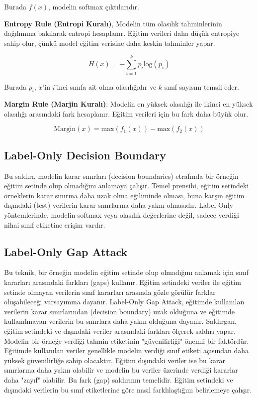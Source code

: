 Burada $f(x)$, modelin softmax çıktılarıdır.

\textbf{Entropy Rule (Entropi Kuralı)}, Modelin tüm olasılık tahminlerinin dağılımına bakılarak entropi hesaplanır. Eğitim verileri daha düşük entropiye sahip olur, çünkü model eğitim verisine daha keskin tahminler yapar.

\[ H(x) = - \sum_{i=1}^{k} p_i \text{log}(p_i) \]

Burada $p_i$, $x$'in $i$'inci sınıfa ait olma olasılığıdır ve $k$ sınıf sayısını temsil eder.

\textbf{Margin Rule (Marjin Kuralı)}: Modelin en yüksek olasılığı ile ikinci en yüksek olasılığı arasındaki fark hesaplanır. Eğitim verileri için bu fark daha büyük olur.

\[ \text{Margin}(x) = \text{max}(f_{1}(x)) - \text{max}(f_{2}(x)) \]

\newpage

\subsection{Label-Only Decision Boundary}

Bu saldırı, modelin karar sınırları (decision boundaries) etrafında bir örneğin eğitim setinde olup olmadığını anlamaya çalışır. Temel prensibi, eğitim setindeki örneklerin karar sınırına daha uzak olma eğiliminde olması, buna karşın eğitim dışındaki (test) verilerin karar sınırlarına daha yakın olmasıdır. Label-Only yöntemlerinde, modelin softmax veya olasılık değerlerine değil, sadece verdiği nihai sınıf etiketine erişim vardır.

\newpage

\subsection{Label-Only Gap Attack}

Bu teknik, bir örneğin modelin eğitim setinde olup olmadığını anlamak için sınıf kararları arasındaki farkları (gaps) kullanır. Eğitim setindeki veriler ile eğitim setinde olmayan verilerin sınıf kararları arasında gözle görülür farklar oluşabileceği varsayımına dayanır. Label-Only Gap Attack, eğitimde kullanılan verilerin karar sınırlarından (decision boundary) uzak olduğuna ve eğitimde kullanılmayan verilerin bu sınırlara daha yakın olduğuna dayanır. Saldırgan, eğitim setindeki ve dışındaki veriler arasındaki farkları ölçerek saldırı yapar. Modelin bir örneğe verdiği tahmin etiketinin "güvenilirliği" önemli bir faktördür. Eğitimde kullanılan veriler genellikle modelin verdiği sınıf etiketi açısından daha yüksek güvenilirliğe sahip olacaktır. Eğitim dışındaki veriler ise bu karar sınırlarına daha yakın olabilir ve modelin bu veriler üzerinde verdiği kararlar daha "zayıf" olabilir. Bu fark (gap) saldırının temelidir. Eğitim setindeki ve dışındaki verilerin bu sınıf etiketlerine göre nasıl farklılaştığını belirlemeye çalışır.


